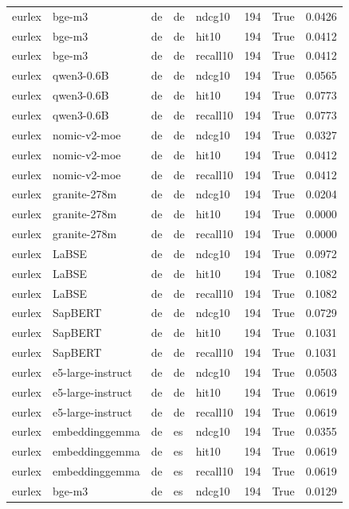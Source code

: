 \begin{tabular}{lllllrrr}
eurlex & bge-m3 & de & de & ndcg10 & 194 & True & 0.0426 \\
eurlex & bge-m3 & de & de & hit10 & 194 & True & 0.0412 \\
eurlex & bge-m3 & de & de & recall10 & 194 & True & 0.0412 \\
eurlex & qwen3-0.6B & de & de & ndcg10 & 194 & True & 0.0565 \\
eurlex & qwen3-0.6B & de & de & hit10 & 194 & True & 0.0773 \\
eurlex & qwen3-0.6B & de & de & recall10 & 194 & True & 0.0773 \\
eurlex & nomic-v2-moe & de & de & ndcg10 & 194 & True & 0.0327 \\
eurlex & nomic-v2-moe & de & de & hit10 & 194 & True & 0.0412 \\
eurlex & nomic-v2-moe & de & de & recall10 & 194 & True & 0.0412 \\
eurlex & granite-278m & de & de & ndcg10 & 194 & True & 0.0204 \\
eurlex & granite-278m & de & de & hit10 & 194 & True & 0.0000 \\
eurlex & granite-278m & de & de & recall10 & 194 & True & 0.0000 \\
eurlex & LaBSE & de & de & ndcg10 & 194 & True & 0.0972 \\
eurlex & LaBSE & de & de & hit10 & 194 & True & 0.1082 \\
eurlex & LaBSE & de & de & recall10 & 194 & True & 0.1082 \\
eurlex & SapBERT & de & de & ndcg10 & 194 & True & 0.0729 \\
eurlex & SapBERT & de & de & hit10 & 194 & True & 0.1031 \\
eurlex & SapBERT & de & de & recall10 & 194 & True & 0.1031 \\
eurlex & e5-large-instruct & de & de & ndcg10 & 194 & True & 0.0503 \\
eurlex & e5-large-instruct & de & de & hit10 & 194 & True & 0.0619 \\
eurlex & e5-large-instruct & de & de & recall10 & 194 & True & 0.0619 \\
eurlex & embeddinggemma & de & es & ndcg10 & 194 & True & 0.0355 \\
eurlex & embeddinggemma & de & es & hit10 & 194 & True & 0.0619 \\
eurlex & embeddinggemma & de & es & recall10 & 194 & True & 0.0619 \\
eurlex & bge-m3 & de & es & ndcg10 & 194 & True & 0.0129 \\

\end{tabular}
